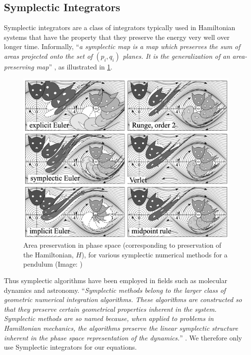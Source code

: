 \subsection{Symplectic Integrators}
Symplectic integrators are a class of integrators typically used in Hamiltonian systems that have the property that they preserve the energy very well over longer time. Informally, ``\textit{a symplectic map is a map which preserves the sum of areas projected onto the set of $(p_i,q_i)$ planes. It is the generalization of an area-preserving map}'' \cite{Weisstein}, as illustrated in \cref{fig:symplectic-area}.

\begin{figure}[ht]
    \centering
    \includegraphics[width=0.90\linewidth]{fig/symplectic-area.png}
    \caption{Area preservation in phase space (corresponding to preservation of the Hamiltonian, $H$), for various symplectic numerical methods for a pendulum (Image: \cite{Hairer})}
    \label{fig:symplectic-area}
\end{figure}

Thus symplectic algorithms have been employed in fields such as molecular dynamics and astronomy. ``\textit{Symplectic methods belong to the larger class of geometric numerical integration algorithms. These algorithms are constructed so that they preserve certain geometrical properties inherent in the system. Symplectic methods are so named because, when applied to problems in Hamiltonian mechanics, the algorithms preserve the linear symplectic structure inherent in the phase space representation of the dynamics.}'' \cite{Donnelly2005}. We therefore only use Symplectic integrators for our equations.


